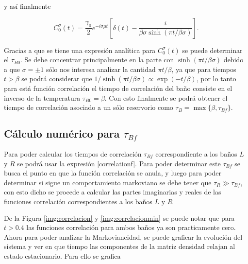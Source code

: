 \begin{appendixs}
y así finalmente

\begin{equation*}
    C^{\sigma}_{0}(t) = \frac{\gamma_{0}}{2}e^{-i\sigma \mu t} \left[\delta(t) - \frac{i}{\beta \sigma \sinh(\pi t/\beta \sigma)} \right].
\end{equation*}

Gracias a que se tiene una expresión analítica para $C^{\sigma}_{0}(t)$ se puede determinar el $\tau_{B0}$. Se debe concentrar principalmente en la parte con $\sinh(\pi t/\beta \sigma)$ debido a que $\sigma=\pm 1$ sólo nos interesa analizar la cantidad $\pi t/\beta$, ya que para tiempos $t > \beta$ se podrá considerar que $1/\sinh(\pi t/\beta \sigma) \propto \exp(-t/\beta)$, por lo tanto para está función correlación el tiempo de correlación del baño consiste en el inverso de la temperatura $\tau_{B0} = \beta$. Con esto finalmente se podrá obtener el tiempo de correlación asociado a un sólo reservorio como $\tau_{B} = \max \{\beta,\tau_{Bf} \}$.  

\label{appendix5correlation}

\subsection{Cálculo numérico para $\tau_{Bf}$}
Para poder calcular los tiempos de correlación $\tau_{Bf}$ correspondiente a los baños $L$ y $R$ se podrá usar la expresión \ref{correlationf}. Para poder determinar este $\tau_{Bf}$ se busca el punto en que la función correlación se anula, y luego para poder determinar si sigue un comportamiento markoviano se debe tener que $\tau_{R}\gg \tau_{Bf}$, con esto dicho se procede a calcular las partes imaginarias y reales de las funciones correlación correspondientes a los baños $L$ y $R$ 


De la Figura \ref{img:correlacion} y \ref{img:correlacionmin} se puede notar que para $t>0.4$ las funciones correlación para ambos baños ya son practicamente cero. Ahora para poder analizar la Markovianeidad, se puede graficar la evolución del sistema y ver en que tiempo las componentes de la matriz densidad relajan al estado estacionario. Para ello se grafica 



\end{appendixs}
